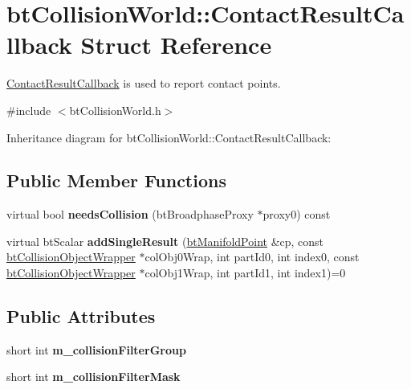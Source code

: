 \hypertarget{structbt_collision_world_1_1_contact_result_callback}{\section{bt\+Collision\+World\+:\+:Contact\+Result\+Callback Struct Reference}
\label{structbt_collision_world_1_1_contact_result_callback}
}


\hyperlink{structbt_collision_world_1_1_contact_result_callback}{Contact\+Result\+Callback} is used to report contact points.  




{\ttfamily \#include $<$bt\+Collision\+World.\+h$>$}



Inheritance diagram for bt\+Collision\+World\+:\+:Contact\+Result\+Callback\+:
\subsection*{Public Member Functions}
\begin{DoxyCompactItemize}
\item 
\hypertarget{structbt_collision_world_1_1_contact_result_callback_a34f7c2fc47e8cca38368285e3a83e08c}{virtual bool {\bfseries needs\+Collision} (bt\+Broadphase\+Proxy $\ast$proxy0) const }\label{structbt_collision_world_1_1_contact_result_callback_a34f7c2fc47e8cca38368285e3a83e08c}

\item 
\hypertarget{structbt_collision_world_1_1_contact_result_callback_a9ee122de8c9b5920a53a2cc69c3c4aa2}{virtual bt\+Scalar {\bfseries add\+Single\+Result} (\hyperlink{classbt_manifold_point}{bt\+Manifold\+Point} \&cp, const \hyperlink{structbt_collision_object_wrapper}{bt\+Collision\+Object\+Wrapper} $\ast$col\+Obj0\+Wrap, int part\+Id0, int index0, const \hyperlink{structbt_collision_object_wrapper}{bt\+Collision\+Object\+Wrapper} $\ast$col\+Obj1\+Wrap, int part\+Id1, int index1)=0}\label{structbt_collision_world_1_1_contact_result_callback_a9ee122de8c9b5920a53a2cc69c3c4aa2}

\end{DoxyCompactItemize}
\subsection*{Public Attributes}
\begin{DoxyCompactItemize}
\item 
\hypertarget{structbt_collision_world_1_1_contact_result_callback_a6b7ee2d7d580191bf4de238f4cadc639}{short int {\bfseries m\+\_\+collision\+Filter\+Group}}\label{structbt_collision_world_1_1_contact_result_callback_a6b7ee2d7d580191bf4de238f4cadc639}

\item 
\hypertarget{structbt_collision_world_1_1_contact_result_callback_a36e0dd3638b9fdbbd1818869823df192}{short int {\bfseries m\+\_\+collision\+Filter\+Mask}}\label{structbt_collision_world_1_1_contact_result_callback_a36e0dd3638b9fdbbd1818869823df192}

\end{DoxyCompactItemize}


